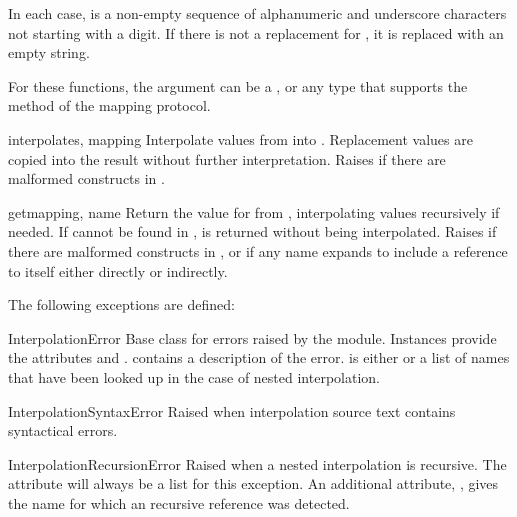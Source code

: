\documentclass{howto}
\begin{document}
In each case,  is a non-empty sequence of alphanumeric and
underscore characters not starting with a digit.  If there is not
a replacement for , it is replaced with an empty string.

For these functions, the  argument can be a ,
or any type that supports the  method of the mapping
protocol.

\begin{funcdesc}{interpolate}{s, mapping}
  Interpolate values from  into .  Replacement
  values are copied into the result without further interpretation.
  Raises  if there are malformed
  constructs in .
\end{funcdesc}

\begin{funcdesc}{get}{mapping, name}
  Return the value for  from , interpolating
  values recursively if needed.  If  cannot be found in
  ,  is returned without being
  interpolated.
  Raises  if there are malformed
  constructs in , or  if
  any name expands to include a reference to itself either directly or
  indirectly.
\end{funcdesc}

The following exceptions are defined:

\begin{excdesc}{InterpolationError}
  Base class for errors raised by the 
  module.  Instances provide the attributes  and
  .   contains a description of the
  error.   is either  or a list of names
  that have been looked up in the case of nested interpolation.
\end{excdesc}

\begin{excdesc}{InterpolationSyntaxError}
  Raised when interpolation source text contains syntactical errors.
\end{excdesc}

\begin{excdesc}{InterpolationRecursionError}
  Raised when a nested interpolation is recursive.  The
   attribute will always be a list for this
  exception.  An additional attribute, , gives the name
  for which an recursive reference was detected.
\end{excdesc}
\end{document}
